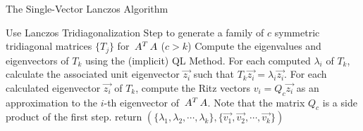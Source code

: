 \begin{frame}[plain]
	\begin{block}{}
\begin{algorithm}[H]
  \label{alg:lasvd}
  \caption{The Single-Vector Lanczos Algorithm}
%
  \DontPrintSemicolon
%
%
%
    \BlankLine
    Use Lanczos Tridiagonalization Step to generate a family of
    $c$ symmetric tridiagonal matrices $\{ T_j \}$ for $\,{A}^{T}\,A$
    ($c > k$) \;
    \BlankLine
%
    Compute the eigenvalues and eigenvectors of $T_k$ using the
    (implicit) QL Method. \;
    \BlankLine
%   
    For each computed $\lambda_i$ of $T_k$, calculate the associated
    unit eigenvector $\vec{z_i}$ such that $T_k\vec{z_i} =
    \lambda_i\vec{z_i}$. \; 
    \BlankLine
% 
    For each calculated eigenvector $\vec{z_i}$ of $T_k$, compute the Ritz
    vectors $v_i = Q_c\vec{z_i}$ as an approximation to the
    $i$-th eigenvector of $\,{A}^{T}\,A$. Note that the matrix $Q_c$ is
    a side product of the first step. \; 
    \BlankLine
%
    return $(\{\lambda_1,\lambda_2,\cdots,\lambda_k\},
            \{\vec{v_1},\vec{v_2},\cdots,\vec{v_k}\})$
%
\end{algorithm}
	\end{block} 
\end{frame}
